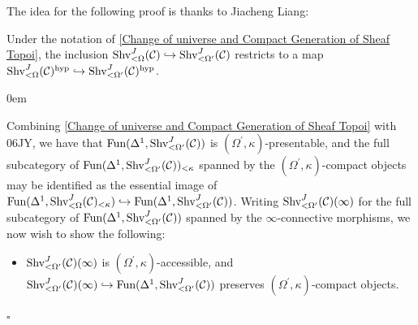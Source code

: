 \documentclass[10pt]{article}
\newcommand{\C}{\mathcal C}
\renewcommand{\qed}{\hfill$\square$}
\renewenvironment{proof}{\begin{addmargin}[1em]{0em}\begin{newproof}}{\end{newproof}\end{addmargin}\qed}
\theoremstyle{witharg}
\theoremstyle{witharg}
\theoremstyle{witharg2}
\begin{document}
\noindent The idea for the following proof is thanks to Jiacheng Liang:


\begin{corollary}{}\label{small hypersheaves are large hypersheaves}

    Under the notation of \ref{Change of universe and Compact Generation of Sheaf Topoi}, the inclusion $\textnormal{Shv}^J_{<\Omega}(\C)\hookrightarrow \textnormal{Shv}^J_{<\Omega^\prime}(\C)$ restricts to a map $\textnormal{Shv}^J_{<\Omega}(\C)^{\textnormal{hyp}}\hookrightarrow \textnormal{Shv}^J_{<\Omega^\prime}(\C)^{\textnormal{hyp}}$. 
    
\end{corollary}

\begin{proof}

     Combining \ref{Change of universe and Compact Generation of Sheaf Topoi} with  06JY, we have that $\textnormal{Fun}(\Delta^1,\textnormal{Shv}^J_{<\Omega^\prime}(\C))$ is $(\Omega^{\prime},\kappa)$-presentable, and the full subcategory of $\textnormal{Fun}(\Delta^1,\textnormal{Shv}^J_{<\Omega^\prime}(\C))_{<\kappa}$ spanned by the $(\Omega^{\prime},\kappa)$-compact objects may be identified as the essential image of $\textnormal{Fun}(\Delta^1,\textnormal{Shv}^J_{<\Omega}(\C)_{<\kappa})\hookrightarrow \textnormal{Fun}(\Delta^1,\textnormal{Shv}^J_{<\Omega^\prime}(\C))$. Writing $\textnormal{Shv}^J_{<\Omega^\prime}(\C)(\infty)$ for the full subcategory of $\textnormal{Fun}(\Delta^1,\textnormal{Shv}^J_{<\Omega^\prime}(\C))$ spanned by the $\infty$-connective morphisms, we now wish to show the following:

      \begin{itemize}
     
         \item [(a)] $\textnormal{Shv}^J_{<\Omega^\prime}(\C)(\infty)$ is $(\Omega^\prime,\kappa)$-accessible, and $\textnormal{Shv}^J_{<\Omega^\prime}(\C)(\infty)\hookrightarrow \textnormal{Fun}(\Delta^1,\textnormal{Shv}^J_{<\Omega^\prime}(\C))$ preserves $(\Omega^\prime,\kappa)$-compact objects. 
         
     \end{itemize}
     

\end{proof}
\end{document}

